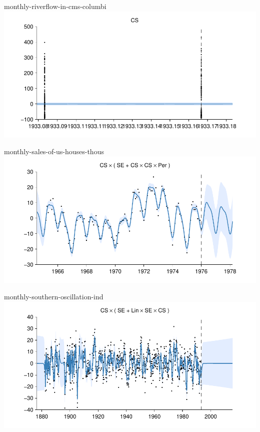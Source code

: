     
\begin{frame}{monthly-riverflow-in-cms-columbi}
  \center
  \includegraphics[width=1.0\textwidth]{figures/monthly-riverflow-in-cms-columbi/monthly-riverflow-in-cms-columbi_all}
\end{frame}  


    
\begin{frame}{monthly-sales-of-us-houses-thous}
  \center
  \includegraphics[width=1.0\textwidth]{figures/monthly-sales-of-us-houses-thous/monthly-sales-of-us-houses-thous_all}
\end{frame}  


    
\begin{frame}{monthly-southern-oscillation-ind}
  \center
  \includegraphics[width=1.0\textwidth]{figures/monthly-southern-oscillation-ind/monthly-southern-oscillation-ind_all}
\end{frame}  


